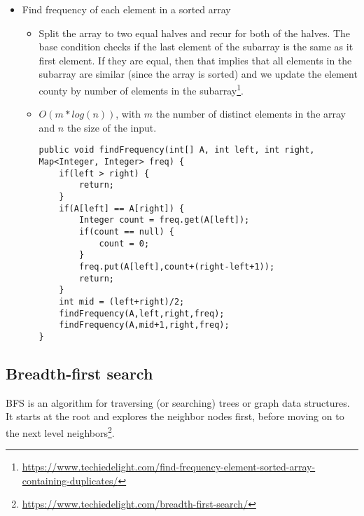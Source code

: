 \documentclass[a4paper, 11.25pt]{article}
\begin{document}
\begin{itemize}
\begin{itemize}
\begin{itemize}
\begin{lstlisting}[style=CStyle]
    if(n==0) {
        return 1;
    }
    int pow = pow(x,n/2);
    if((n&1)==1) { // odd
        return x * pow * pow;
    }
    else { // even
        return pow * pow;
    }
}\end{lstlisting} 
        \end{itemize}
    \end{itemize}
    \item Find frequency of each element in a sorted array
    \begin{itemize}
        \item Split the array to two equal halves and recur for both of the halves. The base condition checks if the last element of the subarray is the same as it first element. If they are equal, then that implies that all elements in the subarray are similar (since the array is sorted) and we update the element county by number of elements in the subarray\footnote{\url{https://www.techiedelight.com/find-frequency-element-sorted-array-containing-duplicates/}}. 
        \item $O(m*log(n))$, with $m$ the number of distinct elements in the array and $n$ the size of the input.
        \begin{lstlisting}[style=CStyle]
public void findFrequency(int[] A, int left, int right, Map<Integer, Integer> freq) {
    if(left > right) {
        return;
    }
    if(A[left] == A[right]) {
        Integer count = freq.get(A[left]);
        if(count == null) {
            count = 0;
        }
        freq.put(A[left],count+(right-left+1));
        return;
    }
    int mid = (left+right)/2;
    findFrequency(A,left,right,freq);
    findFrequency(A,mid+1,right,freq);
}\end{lstlisting}         
    \end{itemize}
\end{itemize}

\subsection{Breadth-first search}
\label{sec:bfs}
BFS is an algorithm for traversing (or searching) trees or graph data structures. It starts at the root and explores the neighbor nodes first, before moving on to the next level neighbors\footnote{\url{https://www.techiedelight.com/breadth-first-search/}}.
\end{document}
